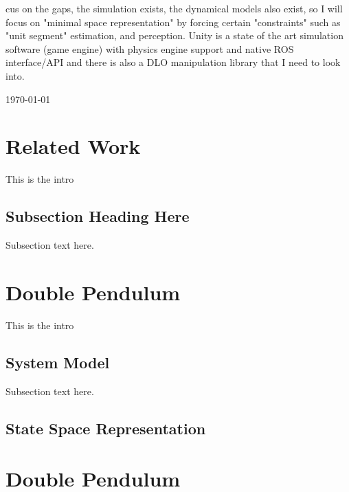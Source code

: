\documentclass[journal]{IEEEtran}
\begin{document}
cus on the gaps, the simulation exists, the dynamical models also exist, so I will focus on "minimal space representation" by forcing certain "constraints" such as "unit segment" estimation, and perception. Unity is a state of the art simulation software (game engine) with physics engine support and native ROS interface/API and there is also a DLO manipulation library that I need to look into.


\hfill {\today}\\
\hfill




\section{Related Work}
This is the intro\\

\subsection{Subsection Heading Here}
Subsection text here.


\section{Double Pendulum}
This is the intro\\

\subsection{System Model}
Subsection text here.

\subsection{State Space Representation}

\subsection{}


\section{Double Pendulum}
\end{document}
